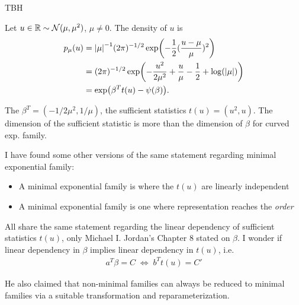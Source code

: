 \begin{define}
	TBH
\end{define}

\begin{example}
	Let $u \in \mathbb{R} \sim \mathcal{N}(\mu, \mu^2)$, $\mu \not=0$. The density of $u$ is
	\begin{align*}
		p_\mu(u)
		 & = \abs{\mu}^{-1}(2\pi)^{-1/2} \exp(-\frac{1}{2}(\frac{u-\mu}{\mu})^2)                     \\
		 & = (2\pi)^{-1/2} \exp(-\frac{u^2}{2\mu^2} + \frac{u}{\mu} - \frac{1}{2} + \log(\abs{\mu})) \\
		 & = \exp(\beta^T t(u) - \psi(\beta)).
	\end{align*}

	The $\beta^T = (-1/2\mu^2, 1/\mu)$,
	the sufficient statistics $t(u) = (u^2, u)$.
	The dimension of the sufficient statistic is more than the dimension of $\beta$ for curved exp. family.
\end{example}




I have found some other versions of the same statement regarding minimal exponential family:
\begin{itemize}
	\item A minimal exponential family is where the $t(u)$ are linearly independent
	\item A minimal exponential family is one where representation reaches the \emph{order}
\end{itemize}

All share the same statement regarding the linear dependency of sufficient statistics $t(u)$,
only Michael I. Jordan's Chapter 8 stated on $\beta$.
I wonder if linear dependency in $\beta$ implies linear dependency in $t(u)$, i.e.
\begin{align*}
	a^T \beta = C \; \Leftrightarrow \; b^Tt(u) = C'
\end{align*}

He also claimed that non-minimal families can always be reduced to minimal families
via a suitable transformation and reparameterization.

